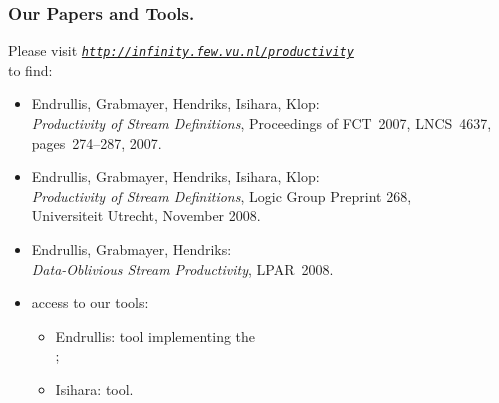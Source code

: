\documentclass[10pt]{beamer}
\begin{document}
\begin{frame}%
  \frametitle{Our Papers and Tools.}

  \vspace*{0.5ex}
  Please visit \href{http://localhost/productivity/}%
         {\emph{\tt http://infinity.few.vu.nl/productivity}}\\
  to find: 
  \vspace*{1.5ex}
  \begin{itemize}
    \item 
      Endrullis, Grabmayer, Hendriks, Isihara, Klop:\\
      \emph{Productivity of Stream Definitions},
      Proceedings of FCT~2007, LNCS~4637, pages~274--287, 2007.
      \vspace*{0.75ex}
    \item  
      Endrullis, Grabmayer, Hendriks, Isihara, Klop:\\
      \emph{Productivity of Stream Definitions},
      Logic Group Preprint 268,\\
      Universiteit Utrecht, November 2008.
      \vspace*{0.75ex}
    \item Endrullis, Grabmayer, Hendriks:\\
      \emph{Data-Oblivious Stream Productivity},
      LPAR~2008.
      \vspace*{0.75ex}
    \item access to our tools:
      \begin{itemize}
        \item Endrullis: tool implementing the\\ 
          \hspace*{3ex}  
          ;
        \item Isihara:  tool.

      \end{itemize} 
  \end{itemize}

\end{frame}%
\end{document}
